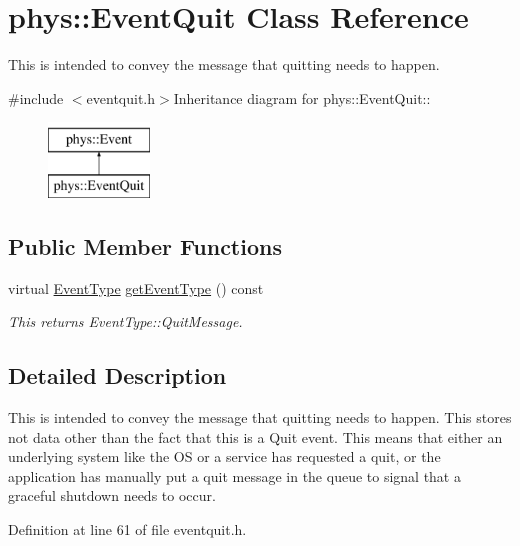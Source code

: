 \hypertarget{classphys_1_1EventQuit}{
\section{phys::EventQuit Class Reference}
\label{dd/dea/classphys_1_1EventQuit}
}


This is intended to convey the message that quitting needs to happen.  


{\ttfamily \#include $<$eventquit.h$>$}Inheritance diagram for phys::EventQuit::\begin{figure}[H]
\begin{center}
\leavevmode
\includegraphics[height=2cm]{dd/dea/classphys_1_1EventQuit}
\end{center}
\end{figure}
\subsection*{Public Member Functions}
\begin{DoxyCompactItemize}
\item 
virtual \hyperlink{classphys_1_1Event_af5fdbb3e08d8e578d58770fbc606fda7}{EventType} \hyperlink{classphys_1_1EventQuit_a4df44098d0ef838db55a8e2a016d0724}{getEventType} () const 
\begin{DoxyCompactList}\small\item\em This returns EventType::QuitMessage. \item\end{DoxyCompactList}\end{DoxyCompactItemize}


\subsection{Detailed Description}
This is intended to convey the message that quitting needs to happen. This stores not data other than the fact that this is a Quit event. This means that either an underlying system like the OS or a service has requested a quit, or the application has manually put a quit message in the queue to signal that a graceful shutdown needs to occur. 

Definition at line 61 of file eventquit.h.

